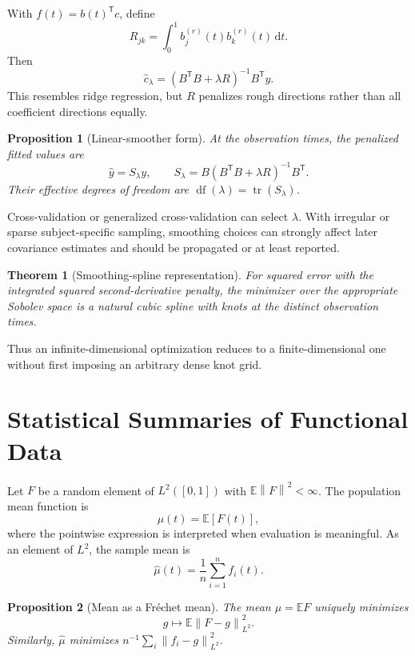 \documentclass[12pt,oneside]{book}
\numberwithin{equation}{section}
\theoremstyle{definition}
\theoremstyle{plain}
\newtheorem{theorem}{Theorem}[section]
\newtheorem{proposition}{Proposition}[section]
\theoremstyle{remark}
\newcommand{\E}{\mathbb{E}}
\newcommand{\norm}[1]{\left\lVert #1 \right\rVert}
\newcommand{\dd}{\,\mathrm{d}}
\newcommand{\tr}{\operatorname{tr}}
\begin{document}
With $f(t)=b(t)^\mathsf Tc$, define
\[
    R_{jk}=\int_0^1b_j^{(r)}(t)b_k^{(r)}(t)\dd t.
\]
Then
\begin{equation}
    \widehat c_\lambda
    =(B^\mathsf TB+\lambda R)^{-1}B^\mathsf Ty.
    \label{eq:penalized-basis-solution}
\end{equation}
This resembles ridge regression, but $R$ penalizes rough directions rather
than all coefficient directions equally.

\begin{proposition}[Linear-smoother form]
At the observation times, the penalized fitted values are
\[
    \widehat y=S_\lambda y,\qquad
    S_\lambda=B(B^\mathsf TB+\lambda R)^{-1}B^\mathsf T.
\]
Their effective degrees of freedom are
$\operatorname{df}(\lambda)=\tr(S_\lambda)$.
\end{proposition}

Cross-validation or generalized cross-validation can select $\lambda$. With
irregular or sparse subject-specific sampling, smoothing choices can strongly
affect later covariance estimates and should be propagated or at least
reported.

\begin{theorem}[Smoothing-spline representation]
For squared error with the integrated squared second-derivative penalty, the
minimizer over the appropriate Sobolev space is a natural cubic spline with
knots at the distinct observation times.
\end{theorem}

Thus an infinite-dimensional optimization reduces to a finite-dimensional
one without first imposing an arbitrary dense knot grid.

\section{Statistical Summaries of Functional Data}

Let $F$ be a random element of $L^2([0,1])$ with
$\E\norm F^2<\infty$. The population mean function is
\[
    \mu(t)=\E[F(t)],
\]
where the pointwise expression is interpreted when evaluation is meaningful.
As an element of $L^2$, the sample mean is
\[
    \widehat\mu(t)=\frac1n\sum_{i=1}^nf_i(t).
\]

\begin{proposition}[Mean as a Fréchet mean]
The mean $\mu=\E F$ uniquely minimizes
\[
    g\longmapsto\E\norm{F-g}_{L^2}^2.
\]
Similarly, $\widehat\mu$ minimizes
$n^{-1}\sum_i\norm{f_i-g}_{L^2}^2$.
\end{proposition}
\end{document}
